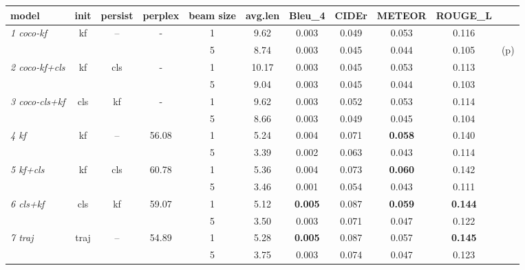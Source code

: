 \begin{table}[t]
  \newcommand{\modpar}[4]{%
    \multirow{2}{*}{\emph{#1}} & \multirow{2}{*}{#2} & \multirow{2}{*}{#3}
    & \multirow{2}{*}{#4}}
\centering
    \begin{tabular}{|l|c|c|c|c|c|c|c|c|c|c|}
        \hline\hline
        \bf model    &\bf init &\bf persist &\bf perplex &\bf beam size &\bf avg.len &\bf Bleu\_4 &\bf CIDEr &\bf METEOR &\bf ROUGE\_L    & \\\hline\hline
        \modpar{1 coco-kf}{kf}{--}{ - }      & 1 & 9.62  &   0.003 &   0.049 &   0.053 &   0.116 &     \\\cline{5-11}
                                       & & & & 5 & 8.74  &   0.003 &   0.045 &   0.044 &   0.105 & (p) \\\hline
        \modpar{2 coco-kf+cls}{kf}{cls}{ - } & 1 & 10.17 &   0.003 &   0.045 &   0.053 &   0.113 &     \\\cline{5-11}
                                       & & & & 5 & 9.04  &   0.003 &   0.045 &   0.044 &   0.103 &     \\\hline
        \modpar{3 coco-cls+kf}{cls}{kf}{ - } & 1 & 9.62  &   0.003 &   0.052 &   0.053 &   0.114 &     \\\cline{5-11}
                                       & & & & 5 & 8.66  &   0.003 &   0.049 &   0.045 &   0.104 &     \\\hline\hline
        \modpar{4 kf}{kf}{--}{56.08}         & 1 & 5.24  &   0.004 &   0.071 &\bf0.058 &   0.140 &     \\\cline{5-11}
                                       & & & & 5 & 3.39  &   0.002 &   0.063 &   0.043 &   0.114 &     \\\hline
        \modpar{5 kf+cls}{kf}{cls}{60.78}    & 1 & 5.36  &   0.004 &   0.073 &\bf0.060 &   0.142 &     \\\cline{5-11}
                                       & & & & 5 & 3.46  &   0.001 &   0.054 &   0.043 &   0.111 &     \\\hline
        \modpar{6 cls+kf}{cls}{kf}{59.07}    & 1 & 5.12  &\bf0.005 &   0.087 &\bf0.059 &\bf0.144 &     \\\cline{5-11}
                                       & & & & 5 & 3.50  &   0.003 &   0.071 &   0.047 &   0.122 &     \\\hline\hline
        \modpar{7 traj}{traj}{--}{54.89}     & 1 & 5.28  &\bf0.005 &   0.087 &   0.057 &\bf0.145 &     \\\cline{5-11}
                                       & & & & 5 & 3.75  &   0.003 &   0.074 &   0.047 &   0.123 &     \\\hline

\end{tabular}
\end{table}
